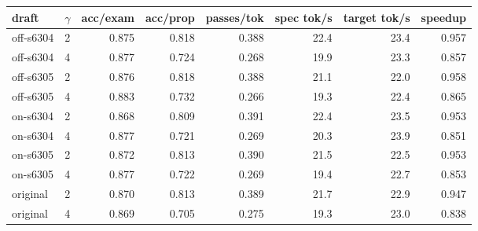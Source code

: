 \begin{tabular}{llrrrrrr}
\toprule
draft & $\gamma$ & acc/exam & acc/prop & passes/tok & spec tok/s & target tok/s & speedup \\
\midrule
off-s6304 & 2 & 0.875 & 0.818 & 0.388 & 22.4 & 23.4 & 0.957 \\
off-s6304 & 4 & 0.877 & 0.724 & 0.268 & 19.9 & 23.3 & 0.857 \\
off-s6305 & 2 & 0.876 & 0.818 & 0.388 & 21.1 & 22.0 & 0.958 \\
off-s6305 & 4 & 0.883 & 0.732 & 0.266 & 19.3 & 22.4 & 0.865 \\
on-s6304 & 2 & 0.868 & 0.809 & 0.391 & 22.4 & 23.5 & 0.953 \\
on-s6304 & 4 & 0.877 & 0.721 & 0.269 & 20.3 & 23.9 & 0.851 \\
on-s6305 & 2 & 0.872 & 0.813 & 0.390 & 21.5 & 22.5 & 0.953 \\
on-s6305 & 4 & 0.877 & 0.722 & 0.269 & 19.4 & 22.7 & 0.853 \\
original & 2 & 0.870 & 0.813 & 0.389 & 21.7 & 22.9 & 0.947 \\
original & 4 & 0.869 & 0.705 & 0.275 & 19.3 & 23.0 & 0.838 \\
\bottomrule
\end{tabular}
